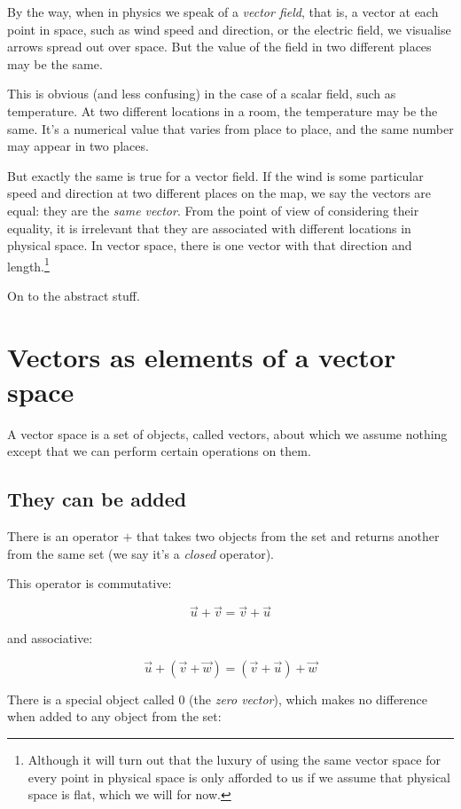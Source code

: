 By the way, when in physics we speak of a \textit{vector field}, that is, a vector at each point in space, such as wind speed and direction, or the electric field, we visualise arrows spread out over space. But the value of the field in two different places may be the same.

This is obvious (and less confusing) in the case of a scalar field, such as temperature. At two different locations in a room, the temperature may be the same. It's a numerical value that varies from place to place, and the same number may appear in two places.

But exactly the same is true for a vector field. If the wind is some particular speed and direction at two different places on the map, we say the vectors are equal: they are the \textit{same vector}. From the point of view of considering their equality, it is irrelevant that they are associated with different locations in physical space. In vector space, there is one vector with that direction and length.\footnote{Although it will turn out that the luxury of using the same vector space for every point in physical space is only afforded to us if we assume that physical space is flat, which we will for now.}

On to the abstract stuff.

\section{Vectors as elements of a vector space}\label{sec:vectors-space}

A vector space is a set of objects, called vectors, about which we assume nothing except that we can perform certain operations on them.

\subsection{They can be added}

There is an operator $+$ that takes two objects from the set and returns another from the same set (we say it's a \textit{closed} operator).

This operator is commutative:

$$\vec{u} + \vec{v} = \vec{v} + \vec{u}$$

and associative:

$$\vec{u} + (\vec{v} + \vec{w}) = (\vec{v} + \vec{u}) + \vec{w}$$

There is a special object called $0$ (the \textit{zero vector}), which makes no difference when added to any object from the set:

